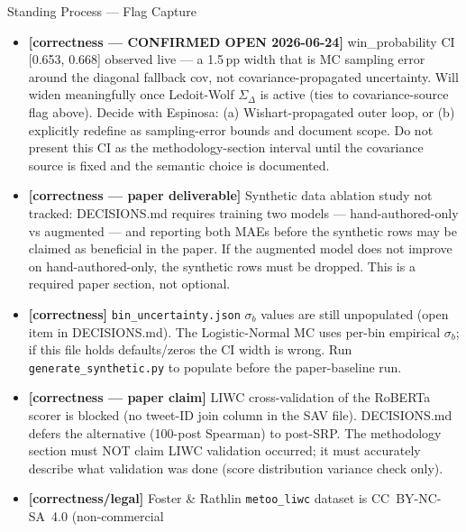 \documentclass[11pt]{article}
\begin{document}
\begin{taskbox}{Standing Process --- Flag Capture}
{\begin{itemize}[leftmargin=1.6em, itemsep=1pt]
      requests over it get a 303 redirect that strips CORS headers. Cold
      start triggered a 14\,GB model re-download (\texttt{snapshot\_download}
      used \texttt{local\_dir} not HF cache format, so \texttt{from\_pretrained}
      re-fetched every time, $\sim$3\,min). Fixed: correct \texttt{cache\_dir}
      format + \texttt{min\_containers=1}.
    \item[$\square$] \textbf{[correctness --- CONFIRMED OPEN 2026-06-24]}
      win\_probability CI [0.653, 0.668] observed live --- a 1.5\,pp
      width that is MC sampling error around the diagonal fallback cov,
      not covariance-propagated uncertainty. Will widen meaningfully once
      Ledoit-Wolf $\Sigma_\Delta$ is active (ties to covariance-source
      flag above). Decide with Espinosa: (a) Wishart-propagated outer
      loop, or (b) explicitly redefine as sampling-error bounds and
      document scope. Do not present this CI as the methodology-section
      interval until the covariance source is fixed and the semantic
      choice is documented.
    \item[$\square$] \textbf{[correctness --- paper deliverable]} Synthetic
      data ablation study not tracked: DECISIONS.md requires training two
      models --- hand-authored-only vs augmented --- and reporting both MAEs
      before the synthetic rows may be claimed as beneficial in the paper.
      If the augmented model does not improve on hand-authored-only, the
      synthetic rows must be dropped. This is a required paper section, not
      optional.
    \item[$\square$] \textbf{[correctness]} \texttt{bin\_uncertainty.json}
      $\sigma_b$ values are still unpopulated (open item in DECISIONS.md).
      The Logistic-Normal MC uses per-bin empirical $\sigma_b$; if this
      file holds defaults/zeros the CI width is wrong. Run
      \texttt{generate\_synthetic.py} to populate before the
      paper-baseline run.
    \item[$\square$] \textbf{[correctness --- paper claim]} LIWC
      cross-validation of the RoBERTa scorer is blocked (no tweet-ID
      join column in the SAV file). DECISIONS.md defers the alternative
      (100-post Spearman) to post-SRP. The methodology section must NOT
      claim LIWC validation occurred; it must accurately describe what
      validation was done (score distribution variance check only).
    \item[$\square$] \textbf{[correctness/legal]} Foster \& Rathlin
      \texttt{metoo\_liwc} dataset is CC~BY-NC-SA~4.0 (non-commercial

\end{itemize}}
\end{taskbox}
\end{document}
